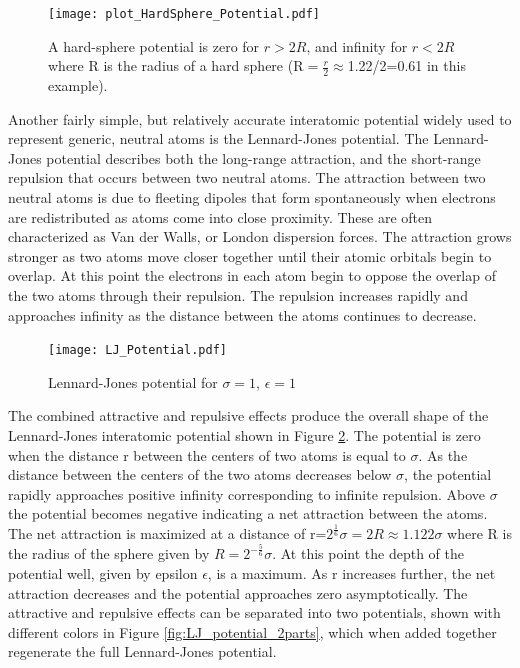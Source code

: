 \documentclass[double,12pt]{beavtex}
\begin{document}
\begin{figure}
    \centering
    \texttt{[image: plot\_HardSphere\_Potential.pdf]}
    \caption{A hard-sphere potential is zero for $r>2R$, and infinity 
    for $r<{2R}$ where R is the radius of a hard sphere 
    (R$=\frac{r}{2}\approx$1.22/2=0.61 in this example).}
    \label{fig:HardSphere_potential}
  \end{figure}

Another fairly simple, but relatively accurate interatomic potential widely 
used to represent generic, neutral atoms is the Lennard-Jones potential. 
The Lennard-Jones potential describes both the long-range attraction, 
and the short-range repulsion that occurs between two neutral atoms. 
The attraction between two neutral atoms is due to fleeting dipoles that 
form spontaneously when electrons are redistributed as atoms come into 
close proximity. These are often characterized as Van der Walls, or London 
dispersion forces. The attraction grows stronger as two atoms move closer 
together until their atomic orbitals begin to overlap. 
At this point the electrons in each atom begin to oppose the overlap of 
the two atoms through their repulsion. The repulsion increases rapidly and 
approaches infinity as the distance between the atoms continues to decrease.  
 
\begin{figure}
    \centering
    \texttt{[image: LJ\_Potential.pdf]}
    \caption{Lennard-Jones potential for $\sigma=1$, $\epsilon=1$}
    \label{fig:LJ_potential}
  \end{figure}

The combined attractive and repulsive effects produce the overall shape of 
the Lennard-Jones interatomic potential shown in Figure \ref{fig:LJ_potential}. 
The potential is zero when the distance r between the centers of two atoms 
is equal to $\sigma$. 
As the distance 
between the centers of the two atoms decreases below $\sigma$, the potential 
rapidly approaches positive infinity corresponding to infinite repulsion. 
Above $\sigma$ the potential becomes negative indicating a net attraction 
between the atoms. The net attraction is maximized at a distance of 
r=$2^\frac{1}{6}\sigma=2R\approx{1.122}\sigma$ where R is the radius of 
the sphere given by $R={2^{-\frac{5}{6}}}\sigma$. At this point the depth of
the potential well, given by epsilon $\epsilon$, is a maximum. As r increases 
further, the net attraction decreases and the potential approaches zero
asymptotically. The attractive and repulsive effects can be separated into two
potentials, shown with different colors in Figure \ref{fig:LJ_potential_2parts}, 
which when added together regenerate the full Lennard-Jones potential. 
\end{document}
